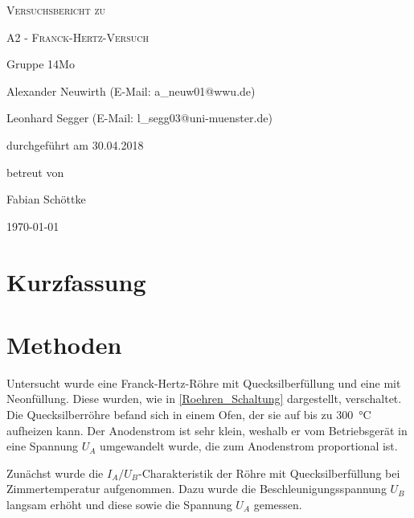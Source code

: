 \documentclass[
	a4paper,
	12pt,
	pagesize,
	ngerman
]{scrartcl}
\begin{document}
	
	\begin{titlepage}
		\centering
		{\scshape\LARGE Versuchsbericht zu \par}
		\vspace{1cm}
		{\scshape\huge A2 - Franck-Hertz-Versuch \par} 
		\vspace{2.5cm}
		{\LARGE Gruppe 14Mo \par}
		\vspace{0.5cm}
		
		{\large Alexander Neuwirth (E-Mail: a\_neuw01@wwu.de) \par}
		{\large Leonhard Segger (E-Mail: l\_segg03@uni-muenster.de) \par}
		\vfill
		
		durchgeführt am 30.04.2018\par
		betreut von\par
		{\large Fabian Schöttke}
		
		\vfill
		
		{\large \today\par}
	\end{titlepage}
	\tableofcontents
	\newpage


	\section{Kurzfassung}
	
	\section{Methoden}
	Untersucht wurde eine Franck-Hertz-Röhre mit Quecksilberfüllung und eine mit Neonfüllung.
	Diese wurden, wie in  \cref{Roehren_Schaltung} dargestellt, verschaltet. %
	Die Quecksilberröhre befand sich in einem Ofen, der sie auf bis zu \SI{300}{\degreeCelsius} aufheizen kann.
	Der Anodenstrom ist sehr klein, weshalb er vom Betriebsgerät in eine Spannung $U_A$ umgewandelt wurde, die zum Anodenstrom proportional ist.
	
	Zunächst wurde die $I_A/U_B$-Charakteristik der Röhre mit Quecksilberfüllung bei Zimmertemperatur aufgenommen.
	Dazu wurde die Beschleunigungsspannung $U_B$ langsam erhöht und diese sowie die Spannung $U_A$ gemessen.
	
\end{document}
